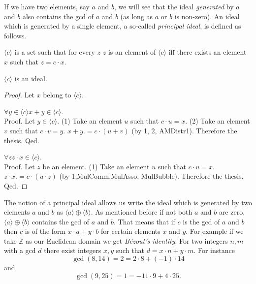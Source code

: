 \documentclass{article}
\newcommand{\Int}{\mathbb{Z}}
\begin{document}
  If we have two elements, say $a$ and $b$, we will see that the ideal \textit{generated} by $a$ and $b$ also contains the gcd of $a$ and $b$ (as long as $a$ or $b$ is non-zero). An ideal which is generated by a single element, a so-called \textit{principal ideal}, is defined as follows.

  \begin{forthel}
    \begin{definition}[DefPrIdeal]
      $\langle c \rangle$ is a set such that for every $z$ $z$ is an element of $\langle c \rangle$ iff there exists an element $x$ such that $z = c \cdot x$.
    \end{definition}

    \begin{lemma}[PrIdeal]
      $\langle c \rangle$ is an ideal.
    \end{lemma}
    \begin{proof}
      Let $x$ belong to $\langle c \rangle$.

      $\forall y \in \langle c \rangle x + y \in \langle c \rangle$. \\
      Proof.
        Let $y \in \langle c \rangle$.
        (1) Take an element $u$ such that $c \cdot u = x$.
        (2) Take an element $v$ such that $c \cdot v = y$.
        $x + y .= c \cdot (u + v)$ (by 1, 2, AMDistr1). Therefore the thesis.
      Qed.

      $\forall z z \cdot x \in \langle c \rangle$. \\
      Proof.
        Let $z$ be an element.
        (1) Take an element $u$ such that $c \cdot u = x$.
        $z \cdot x .= c \cdot (u \cdot z)$ (by 1,MulComm,MulAsso, MulBubble). Therefore the thesis.
      Qed.
    \end{proof}
  \end{forthel}

  The notion of a principal ideal allows us write the ideal which is generated by two elements $a$ and $b$ as $\langle a \rangle \oplus \langle b \rangle$. As mentioned before if not both $a$ and $b$ are zero, $\langle a \rangle \oplus \langle b \rangle$ contains the gcd of $a$ and $b$. That means that if $c$ is the gcd of $a$ and $b$ then $c$ is of the form $x \cdot a + y \cdot b$ for certain elements $x$ and $y$. For example if we take $\Int$ as our Euclidean domain we get \textit{Bézout's identity}: For two integers $n,m$ with a gcd $d$ there exist integers $x,y$ such that $d = x \cdot n + y \cdot m$. For instance
  $$\gcd(8,14) = 2 = 2 \cdot 8 + (-1) \cdot 14$$
  and
  $$\gcd(9,25) = 1 = -11 \cdot 9 + 4 \cdot 25.$$
\end{document}
